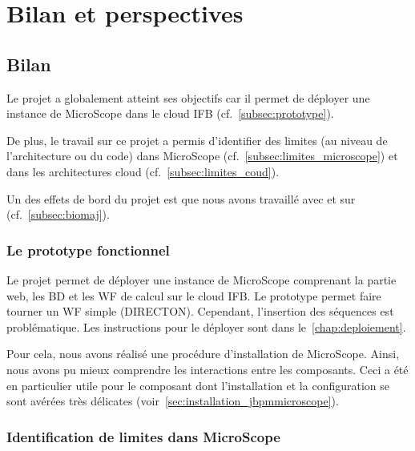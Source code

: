 \chapter{Bilan et perspectives}

\section{Bilan}

Le projet a globalement atteint ses objectifs car il permet de déployer une instance de MicroScope dans le cloud IFB (cf.~\autoref{subsec:prototype}).

De plus, le travail sur ce projet a permis d'identifier des limites (au niveau de l'architecture ou du code) dans MicroScope (cf.~\autoref{subsec:limites_microscope})
et dans les architectures cloud (cf.~\autoref{subsec:limites_coud}).

Un des effets de bord du projet est que nous avons travaillé avec et sur  (cf.~\autoref{subsec:biomaj}).

\subsection{Le prototype fonctionnel} \label{subsec:prototype}

Le projet permet de déployer une instance de MicroScope
comprenant la partie web, les BD et les WF de calcul
sur le cloud IFB.
Le prototype permet faire tourner un WF simple (DIRECTON).
Cependant, l'insertion des séquences est problématique.
Les instructions pour le déployer sont dans le~\autoref{chap:deploiement}.

Pour cela, nous avons réalisé une procédure d'installation de MicroScope.
Ainsi, nous avons pu mieux comprendre les interactions entre les composants.
Ceci a été en particulier utile pour le composant  dont l'installation et la configuration
se sont avérées très délicates (voir~\autoref{sec:installation_jbpmmicroscope}).

\subsection{Identification de limites dans MicroScope} \label{subsec:limites_microscope}

